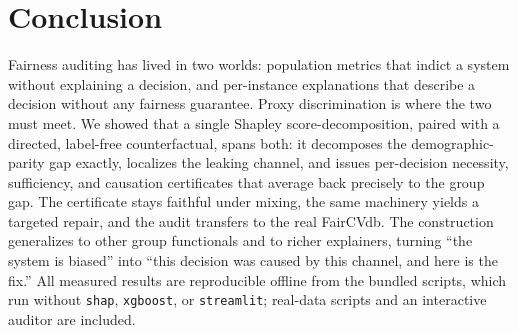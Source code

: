 \documentclass[sn-mathphys-num]{sn-jnl}
\begin{document}
\section{Conclusion}
\label{sec:conclusion}
Fairness auditing has lived in two worlds: population metrics that indict a system
without explaining a decision, and per-instance explanations that describe a
decision without any fairness guarantee. Proxy discrimination is where the two
must meet. We showed that a single Shapley score-decomposition, paired with a
directed, label-free counterfactual, spans both: it decomposes the
demographic-parity gap exactly, localizes the leaking channel, and issues
per-decision necessity, sufficiency, and causation certificates that average back
precisely to the group gap. The certificate stays faithful under mixing, the same
machinery yields a targeted repair, and the audit transfers to the real FairCVdb.
The construction generalizes to other group functionals and to richer explainers,
turning ``the system is biased'' into ``this decision was caused by this channel,
and here is the fix.'' All measured results are reproducible offline from the
bundled scripts, which run without \texttt{shap}, \texttt{xgboost}, or
\texttt{streamlit}; real-data scripts and an interactive auditor are included.

{\small


}
\end{document}
